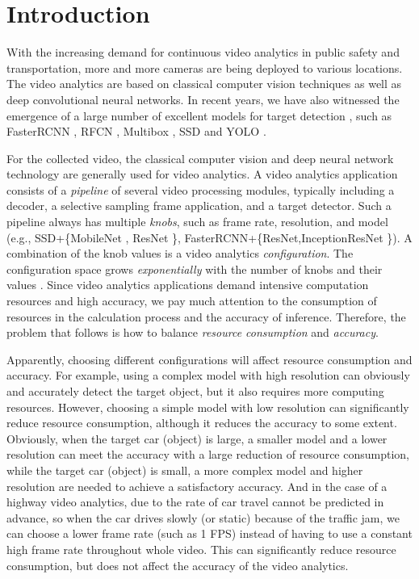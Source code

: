 \section{Introduction}
\label{Section: introduction}
With the increasing demand for continuous video analytics in public safety and transportation, more and more cameras are being deployed to various locations. The video analytics are based on classical computer vision techniques as well as deep convolutional neural networks. In recent years, we have also witnessed the emergence of a large number of excellent models for target detection \cite{huang2017speed_accuracy}, such as FasterRCNN \cite{ren2015faster_rcnn}, RFCN \cite{dai2016r_fcn}, Multibox \cite{szegedy2014multibox}, SSD \cite{liu2016ssd} and YOLO \cite{redmon2016yolo}.

For the collected video, the classical computer vision and deep neural network technology are generally used for video analytics. A video analytics application consists of a \emph{pipeline} of several video processing modules, typically including a decoder, a selective sampling frame application, and a target detector. Such a pipeline always has multiple \emph{knobs}, such as frame rate, resolution, and model (e.g., SSD+\{MobileNet \cite{howard2017mobilenets}, ResNet \cite{he2016resnet}\}, FasterRCNN+\{ResNet,InceptionResNet \cite{szegedy2016inception}\}). A combination of the knob values is a video analytics \emph{configuration}. The configuration space grows \emph{exponentially} with the number of knobs and their values \cite{jiang2018chameleon}. Since video analytics applications demand intensive computation resources and high accuracy, we pay much attention to the consumption of resources in the calculation process and the accuracy of inference. Therefore, the problem that follows is how to balance \emph{resource consumption} and \emph{accuracy}. 

Apparently, choosing different configurations will affect resource consumption and accuracy. For example, using a complex model with high resolution can obviously and accurately detect the target object, but it also requires more computing resources. However, choosing a simple model with low resolution can significantly reduce resource consumption, although it reduces the accuracy to some extent. Obviously, when the target car (object) is large, a smaller model and a lower resolution can meet the accuracy with a large reduction of resource consumption, while the target car (object) is small, a more complex model and higher resolution are needed to achieve a satisfactory accuracy. And in the case of a highway video analytics, due to the rate of car travel cannot be predicted in advance, so when the car drives slowly (or static) because of the traffic jam, we can choose a lower frame rate (such as 1 FPS) instead of having to use a constant high frame rate throughout whole video. This can significantly reduce resource consumption, but does not affect the accuracy of the video analytics. 

